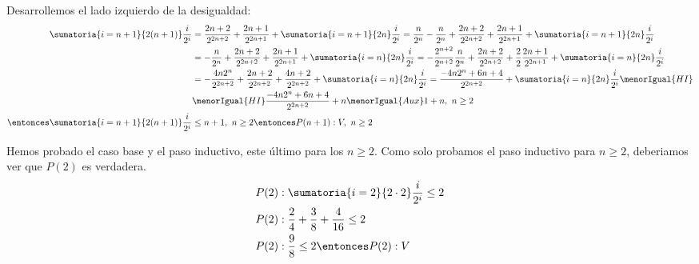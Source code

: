 \begin{enumerate}[label=\roman*)]
\begin{enumerate}[label=\arabic*)]
                Desarrollemos el lado izquierdo de la desigualdad:
                \begin{align*}
                  \sumatoria{i=n+1}{2(n+1)} \frac{i}{2^i}           & = \frac{2n+2}{2^{2n+2}} + \frac{2n+1}{2^{2n+1}}
                  + \sumatoria{i=n+1}{2n} \frac{i}{2^i} = \frac{n}{2^n} - \frac{n}{2^n} + \frac{2n+2}{2^{2n+2}}
                  + \frac{2n+1}{2^{2n+1}} + \sumatoria{i=n+1}{2n} \frac{i}{2^i}                                                                                             \\
                                                                    & = - \frac{n}{2^n} + \frac{2n+2}{2^{2n+2}} + \frac{2n+1}{2^{2n+1}} + \sumatoria{i=n}{2n} \frac{i}{2^i}
                  = - \frac{2^{n+2}}{2^{n+2}}\frac{n}{2^n} + \frac{2n+2}{2^{2n+2}} + \frac{2}{2}\frac{2n+1}{2^{2n+1}}
                  + \sumatoria{i=n}{2n} \frac{i}{2^i}                                                                                                                       \\
                                                                    & = - \frac{4n 2^n}{2^{2n+2}} + \frac{2n+2}{2^{2n+2}} + \frac{4n+2}{2^{2n+2}}
                  + \sumatoria{i=n}{2n} \frac{i}{2^i} = \frac{-4n 2^n + 6n + 4}{2^{2n+2}} + \sumatoria{i=n}{2n} \frac{i}{2^i}
                  \menorIgual{HI}                                                                                                                                           \\
                                                                    & \menorIgual{HI} \frac{-4n 2^n + 6n + 4}{2^{2n+2}} + n
                  \menorIgual{Aux} 1 + n, \ n \geq 2                                                                                                                        \\
                  \entonces \sumatoria{i=n+1}{2(n+1)} \frac{i}{2^i} & \leq n + 1, \ n \geq 2 \entonces P(n+1): V, \ n \geq 2
                \end{align*}

        \end{enumerate}

        Hemos probado el caso base y el paso inductivo, este último para los $n \geq 2$. Como solo probamos el paso
        inductivo para $n \geq 2$, deberiamos ver que $P(2)$ es verdadera.
        \begin{align*}
          P(2) & : \sumatoria{i=2}{2 \cdot 2} \frac{i}{2^i} \leq 2 \\
          P(2) & : \frac{2}{4} + \frac{3}{8} + \frac{4}{16} \leq 2 \\
          P(2) & : \frac{9}{8} \leq 2 \entonces P(2): V
        \end{align*}


\end{enumerate}
